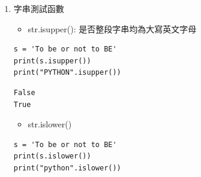 \documentclass[a4paper,12pt]{article}
\begin{document}
\begin{enumerate}
\begin{verbatim}
To be or not to be
\end{verbatim}


\begin{itemize}
\item str.title(s): 每個單字的第一個字元大寫\\
\end{itemize}
\lstset{breaklines=true,language=Python,label= ,caption= ,captionpos=b,firstnumber=1,numbers=left}
\begin{lstlisting}
s = 'To be or not to BE'
print(s.title())
\end{lstlisting}

\begin{verbatim}
To Be Or Not To Be
\end{verbatim}


\begin{itemize}
\item str.replace(old, new): 置換子字串\\
\end{itemize}
\lstset{breaklines=true,language=Python,label= ,caption= ,captionpos=b,firstnumber=1,numbers=left}
\begin{lstlisting}
s = 'To be or not to BE'
print(s.replace('be', 'die'))
\end{lstlisting}

\begin{verbatim}
To die or not to BE
\end{verbatim}

\item 字串測試函數
\label{sec:orga4208b0}
\begin{itemize}
\item str.isupper(): 是否整段字串均為大寫英文字母\\
\end{itemize}
\lstset{breaklines=true,language=Python,label= ,caption= ,captionpos=b,firstnumber=1,numbers=left}
\begin{lstlisting}
s = 'To be or not to BE'
print(s.isupper())
print("PYTHON".isupper())
\end{lstlisting}

\begin{verbatim}
False
True
\end{verbatim}


\begin{itemize}
\item str.islower()\\
\end{itemize}
\lstset{breaklines=true,language=Python,label= ,caption= ,captionpos=b,firstnumber=1,numbers=left}
\begin{lstlisting}
s = 'To be or not to BE'
print(s.islower())
print("python".islower())
\end{lstlisting}


\end{enumerate}
\end{document}
